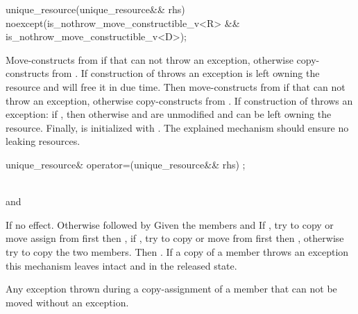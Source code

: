 \documentclass[ebook,11pt,article]{memoir}
\begin{document}
\begin{itemdecl}
unique_resource(unique_resource&& rhs) 
  noexcept(is_nothrow_move_constructible_v<R> &&
           is_nothrow_move_constructible_v<D>);
\end{itemdecl}
\begin{itemdescr}
\pnum
\effects Move-constructs  from  if that can not throw an exception, otherwise copy-constructs  from .  
\enternote
If construction of  throws an exception  is left owning the resource and will free it in due time.
\exitnote
Then move-constructs  from  if that can not throw an exception, otherwise copy-constructs  from . If construction of  throws an exception: if , then  otherwise  and  are unmodified and  can be left owning the resource. 
Finally,  is initialized with .
\enternote
The explained mechanism should ensure no leaking resources.
\exitnote
\end{itemdescr}

\begin{itemdecl}
unique_resource& operator=(unique_resource&& rhs) ;
\end{itemdecl}

\begin{itemdescr}
\pnum
\requires \\
and\\

\pnum
\effects If  no effect. Otherwise  followed by
Given the members  and  
If , try to copy or move assign  from  first then , if  , try to copy or move  from  first then , otherwise try to copy the two members. Then . 
\enternote
If a copy of a member throws an exception this mechanism leaves  intact and  in the released state.
\exitnote

\pnum
\throws Any exception thrown during a copy-assignment of a member that can not be moved without an exception.
\end{itemdescr}
\end{document}
